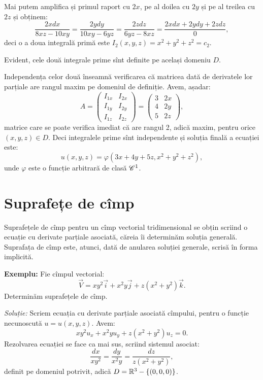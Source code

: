 Mai putem amplifica și primul raport cu $ 2x $, pe al doilea cu $ 2y $ și
pe al treilea cu $ 2z $ și obținem:
\[
  \dfrac{2xdx}{8xz - 10xy} = \dfrac{2ydy}{10xy - 6yz} = \dfrac{2zdz}{6yz - 8xz} = %
  \dfrac{2xdx + 2ydy + 2zdz}{0},
\]
deci o a doua integrală primă este $ I_2(x, y, z) = x^2 + y^2 + z^2 = c_2 $.

Evident, cele două integrale prime sînt definite pe același domeniu $ D $.

Independența celor două înseamnă verificarea că matricea dată de derivatele
lor par\-ți\-a\-le are rangul maxim pe domeniul de definiție. Avem, așadar:
\[
  A = \begin{pmatrix}
    I_{1x} & I_{2x} \\
    I_{1y} & I_{2y} \\
    I_{1z} & I_{2z}
  \end{pmatrix} = \begin{pmatrix}
    3 & 2x \\
    4 & 2y \\
    5 & 2z
  \end{pmatrix},
\]
matrice care se poate verifica imediat că are rangul 2, adică maxim, pentru orice
$(x,y,z) \in D $. Deci integralele prime sînt independente și soluția finală a
ecuației este:
\[
  u(x, y, z) = \varphi(3x + 4y + 5z, x^2 + y^2 + z^2),
\]
unde $ \varphi $ este o funcție arbitrară de clasă $ \mathscr{C}^1 $.


\section{Suprafețe de cîmp}

\indent\indent Suprafețele de cîmp pentru un cîmp vectorial tridimensional
se obțin scriind o ecuație cu derivate parțiale asociată, căreia îi determinăm
soluția generală. Suprafața de cîmp este, atunci, dată de anularea soluției
generale, scrisă în forma implicită.

\textbf{Exemplu:} Fie cîmpul vectorial:
\[
  \vec{V} = xy^2 \vec{i} + x^2y \vec{j} + z(x^2 + y^2) \vec{k}.
\]
Determinăm suprafețele de cîmp.

\emph{Soluție:} Scriem ecuația cu derivate parțiale asociată cîmpului,
pentru o funcție necunoscută $ u = u(x, y, z) $. Avem:
\[
  xy^2 u_x + x^2y u_y + z(x^2 + y^2)u_z = 0. 
\]
Rezolvarea ecuației se face ca mai sus, scriind sistemul asociat:
\[
  \dfrac{dx}{xy^2} = \dfrac{dy}{x^2y} = \dfrac{dz}{z(x^2 + y^2)},
\]
definit pe domeniul potrivit, adică $ D = \mathbb{R}^3 - \{(0, 0, 0)\}$.

